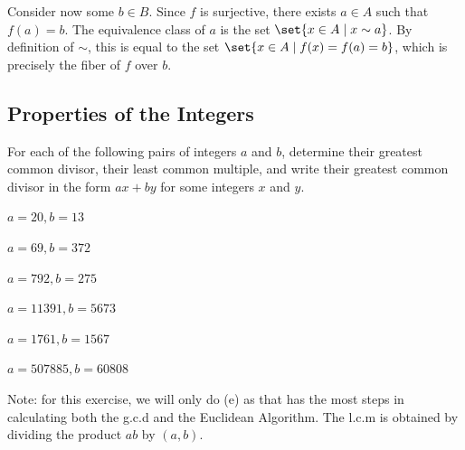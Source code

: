 \begin{problems}
\begin{sol}
        Consider now some $b \in B$. Since $f$ is surjective, there exists $a \in A$ such that $f(a) = b$. The equivalence class of $a$ is the set $\set{x \in A \mid x \sim a}$. By definition of $\sim$, this is equal to the set $\set{x \in A \mid f(x) = f(a) = b}$, which is precisely the fiber of $f$ over $b$.
    \end{sol}
\end{problems}

\newpage

\subsection{Properties of the Integers}

\begin{problems}
    \item For each of the following pairs of integers $a$ and $b$, determine their greatest common divisor, their least common multiple, and write their greatest common divisor in the form $ax + by$ for some integers $x$ and $y$.
    \begin{problems}
        \item $a = 20, b = 13$
        \item $a= 69, b = 372$
        \item $a = 792, b = 275$
        \item $a = 11391, b = 5673$
        \item $a= 1761, b = 1567$
        \item $a = 507885, b = 60808$
    \end{problems}
    \begin{solalph}
        \item Note: for this exercise, we will only do (e) as that has the most steps in calculating both the g.c.d and the Euclidean Algorithm. The l.c.m is obtained by dividing the product $ab$ by $(a, b)$.
        

\end{solalph}
\end{problems}
